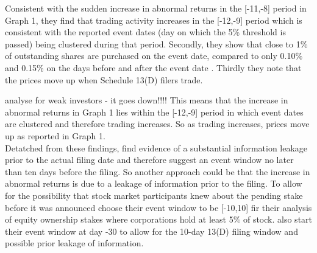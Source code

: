 \documentclass[12pt]{article}
\begin{document}
Consistent with the sudden increase in abnormal returns in the [-11,-8] period in Graph 1, they find that trading activity increases in the [-12,-9] period which is consistent with the reported event dates (day on which the 5\% threshold is passed) being clustered during that period. Secondly, they show that close to 1\% of outstanding shares are purchased on the event date, compared to only 0.10\% and 0.15\% on the days before and after the event date \citep[p.1561]{Collin-Dufresne2015}. Thirdly they note that the prices move up when Schedule 13(D) filers trade. 

analyse for weak investors - it goes down!!!! 
This means that the increase in abnormal returns in Graph 1 lies within the [-12,-9] period in which event dates are clustered and therefore trading increases. So as trading increases, prices move up as reported in Graph 1.\\ 
Detatched from these findings, \citet[p.31]{Brigida2012} find evidence of a substantial information leakage prior to the actual filing date and therefore suggest an event window no later than ten days before the filing. So another approach could be that the increase in abnormal returns is due to a leakage of information prior to the filing. To allow for the possibility that stock market participants knew about the pending stake before it was announced \citet[p.2802]{Allen2000} choose their event window to be [-10,10] fir their analysis of equity ownership stakes where corporations hold at least 5\% of stock. \citet[p.207]{Klein2009} also start their event window at day -30 to allow for the 10-day 13(D) filing window and possible prior leakage of information.  
\end{document}

